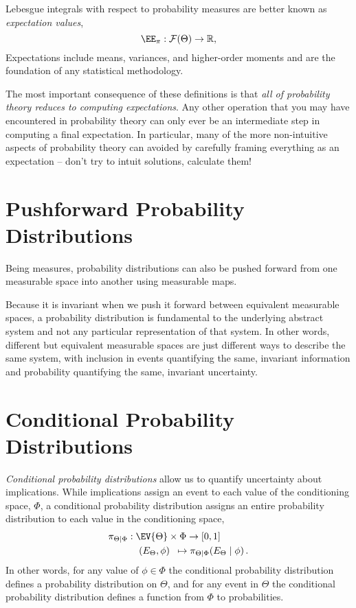 Lebesgue integrals with respect to probability measures are better
known as \emph{expectation values},
%
\begin{equation*}
\EE_{\pi} : \mathcal{F} \! \left( \Theta \right) \rightarrow \mathbb{R},
\end{equation*}
%
Expectations include means, variances, and higher-order moments
and are the foundation of any statistical methodology.

The most important consequence of these definitions is that 
\emph{all of probability theory reduces to computing expectations}.  
Any other operation that you may have encountered in probability 
theory can only ever be an intermediate step in computing a final 
expectation.  In particular, many of the more non-intuitive aspects 
of probability theory can avoided by carefully framing everything 
as an expectation -- don't try to intuit solutions, calculate them!

\section{Pushforward Probability Distributions}

Being measures, probability distributions can also be pushed
forward from one measurable space into another using measurable
maps.

Because it is invariant when we push it forward between equivalent 
measurable spaces, a probability distribution is fundamental to the 
underlying abstract system and not any particular representation of 
that system.  In other words, different but equivalent measurable 
spaces are just different ways to describe the same system, with 
inclusion in events quantifying the same, invariant information and 
probability quantifying the same, invariant uncertainty.

\section{Conditional Probability Distributions}

\emph{Conditional probability distributions} allow us to quantify 
uncertainty about implications.  While implications assign an event 
to each value of the conditioning space, $\Phi$, a conditional 
probability distribution assigns an entire probability distribution 
to each value in the conditioning space,
%
\begin{align*}
\pi_{\Theta \mid \Phi} 
&: \EV{\Theta} \times \Phi \rightarrow \left[0, 1 \right] \\
&\quad \left( E_{\Theta}, \phi \right) \;\; \mapsto 
\pi_{\Theta \mid \Phi} \! \left( E_{\Theta} \mid \phi \right).
\end{align*}
%
In other words, for any value of $\phi \in \Phi$ the conditional 
probability distribution defines a probability distribution on $\Theta$, 
and for any event in $\Theta$ the conditional probability distribution 
defines a function from $\Phi$ to probabilities.  

